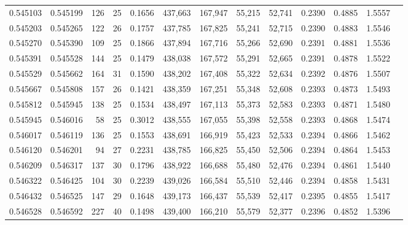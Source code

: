 \begin{tabular}{rrrrrrrrrrrrr}
0.545103 & 0.545199 & 126 &  25 &                                     0.1656 & 437,663 & 167,947 &  55,215 &  52,741 & 0.2390 & 0.4885 & 1.5557 \\
0.545203 & 0.545265 & 122 &  26 &                                     0.1757 & 437,785 & 167,825 &  55,241 &  52,715 & 0.2390 & 0.4883 & 1.5546 \\
0.545270 & 0.545390 & 109 &  25 &                                     0.1866 & 437,894 & 167,716 &  55,266 &  52,690 & 0.2391 & 0.4881 & 1.5536 \\
0.545391 & 0.545528 & 144 &  25 &                                     0.1479 & 438,038 & 167,572 &  55,291 &  52,665 & 0.2391 & 0.4878 & 1.5522 \\
0.545529 & 0.545662 & 164 &  31 &                                     0.1590 & 438,202 & 167,408 &  55,322 &  52,634 & 0.2392 & 0.4876 & 1.5507 \\
0.545667 & 0.545808 & 157 &  26 &                                     0.1421 & 438,359 & 167,251 &  55,348 &  52,608 & 0.2393 & 0.4873 & 1.5493 \\
0.545812 & 0.545945 & 138 &  25 &                                     0.1534 & 438,497 & 167,113 &  55,373 &  52,583 & 0.2393 & 0.4871 & 1.5480 \\
0.545945 & 0.546016 &  58 &  25 &                                     0.3012 & 438,555 & 167,055 &  55,398 &  52,558 & 0.2393 & 0.4868 & 1.5474 \\
0.546017 & 0.546119 & 136 &  25 &                                     0.1553 & 438,691 & 166,919 &  55,423 &  52,533 & 0.2394 & 0.4866 & 1.5462 \\
0.546120 & 0.546201 &  94 &  27 &                                     0.2231 & 438,785 & 166,825 &  55,450 &  52,506 & 0.2394 & 0.4864 & 1.5453 \\
0.546209 & 0.546317 & 137 &  30 &                                     0.1796 & 438,922 & 166,688 &  55,480 &  52,476 & 0.2394 & 0.4861 & 1.5440 \\
0.546322 & 0.546425 & 104 &  30 &                                     0.2239 & 439,026 & 166,584 &  55,510 &  52,446 & 0.2394 & 0.4858 & 1.5431 \\
0.546432 & 0.546525 & 147 &  29 &                                     0.1648 & 439,173 & 166,437 &  55,539 &  52,417 & 0.2395 & 0.4855 & 1.5417 \\
0.546528 & 0.546592 & 227 &  40 &                                     0.1498 & 439,400 & 166,210 &  55,579 &  52,377 & 0.2396 & 0.4852 & 1.5396 \\

\end{tabular}
